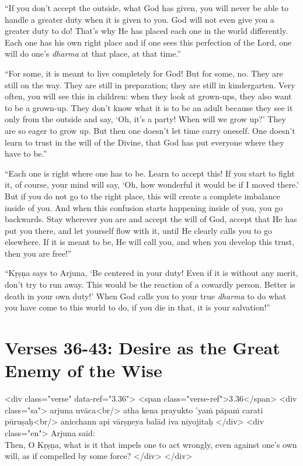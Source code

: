 \enquote{If you don’t accept the outside, what God has given, you will never be able to handle a greater duty when it is given to you. God will not even give you a greater duty to do! That’s why He has placed each one in the world differently. Each one has his own right place and if one sees this perfection of the Lord, one will do one’s \textit{dharma} at that place, at that time.}

\enquote{For some, it is meant to live completely for God! But for some, no. They are still on the way. They are still in preparation; they are still in kindergarten. Very often, you will see this in children: when they look at grown-ups, they also want to be a grown-up. They don’t know what it is to be an adult because they see it only from the outside and say, \enquote{Oh, it’s a party! When will we grow up?} They are so eager to grow up. But then one doesn’t let time carry oneself. One doesn’t learn to trust in the will of the Divine, that God has put everyone where they have to be.}

\enquote{Each one is right where one has to be. Learn to accept this! If you start to fight it, of course, your mind will say, \enquote{Oh, how wonderful it would be if I moved there.} But if you do not go to the right place, this will create a complete imbalance inside of you. And when this confusion starts happening inside of you, you go backwards. Stay wherever you are and accept the will of God, accept that He has put you there, and let yourself flow with it, until He clearly calls you to go elsewhere. If it is meant to be, He will call you, and when you develop this trust, then you are free!}

\enquote{Kṛṣṇa says to Arjuna, \enquote{Be centered in your duty! Even if it is without any merit, don’t try to run away. This would be the reaction of a cowardly person. Better is death in your own duty!} When God calls you to your true \textit{dharma} to do what you have come to this world to do, if you die in that, it is your salvation!}

\section{Verses 36-43: Desire as the Great Enemy of the Wise}\label{sec-verses-36-43-desire-as-the-great-enemy-of-the-wise}

\begin{html}
<div class="verse" data-ref="3.36">
  <span class="verse-ref">3.36</span>
  <div class="sa">
    arjuna uvāca<br/>
    atha kena prayukto ’yaṁ pāpaṁ carati pūruṣaḥ<br/>
    anicchann api vārṣṇeya balād iva niyojitaḥ
  </div>
  <div class="en">
    \hspace*{1em}Arjuna said: \\ Then, O Kṛṣṇa, what is it that impels one to act wrongly, even against one’s own will, as if compelled by some force?
  </div>
</div>
\end{html}


